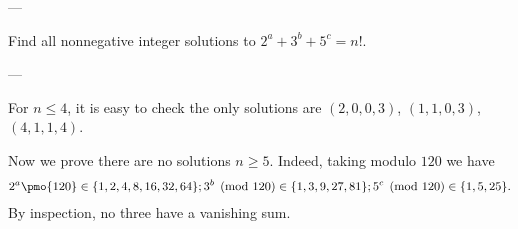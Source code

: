 
---

Find all nonnegative integer solutions to $2^a+3^b+5^c=n!$.

---

For $n\le4$, it is easy to check the only solutions are $(2,0,0,3)$, $(1,1,0,3)$, $(4,1,1,4)$.

Now we prove there are no solutions $n\ge5$. Indeed, taking modulo $120$ we have
\begin{align*}
    2^a\pmo{120}\in\{1,2,4,8,16,32,64\};
    3^b\pmod{120}\in\{1,3,9,27,81\};
    5^c\pmod{120}\in\{1,5,25\}.
\end{align*}
By inspection, no three have a vanishing sum.
